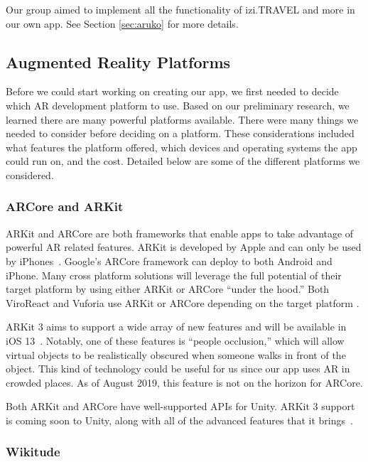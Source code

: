 \documentclass[a4paper, 10pt, american, titlepage]{article}
\begin{document}
Our group aimed to implement all the functionality of izi.TRAVEL and more in
our own app. See Section \ref{sec:aruko} for more details.

\subsection{Augmented Reality Platforms}
\label{sec:platforms}

Before we could start working on creating our app, we first needed to decide
which AR development platform to use. Based on our preliminary research, we
learned there are many powerful platforms available. There were many things we
needed to consider before deciding on a platform. These considerations included
what features the platform offered, which devices and operating systems the app
could run on, and the cost. Detailed below are some of the different platforms
we considered.

\subsubsection{ARCore and ARKit}
\label{sec:ARCoreAndARKit}

ARKit and ARCore are both frameworks that enable apps to take advantage of
powerful AR related features. ARKit is developed by Apple and can only be used
by iPhones~\autocite{summerson2018}. Google's ARCore framework can deploy to both
Android and iPhone. Many cross platform solutions will leverage the full
potential of their target platform by using either ARKit or ARCore ``under the
hood.'' Both ViroReact and Vuforia use ARKit or ARCore depending on the target
platform \autocites{vuforiaFusion}{moon2018}.

ARKit 3 aims to support a wide array of new features and will be available in
iOS 13~\autocite{apple2019}. Notably, one of these features is ``people
occlusion,'' which will allow virtual objects to be realistically obscured when
someone walks in front of the object. This kind of technology could be useful
for us since our app uses AR in crowded places.  As of August 2019, this
feature is not on the horizon for ARCore.

Both ARKit and ARCore have well-supported APIs for Unity. ARKit 3 support is
coming soon to Unity, along with all of the advanced features that it
brings~\autocite{stinson2019}.

\subsubsection{Wikitude}
\label{sec:wikitude}
\end{document}
